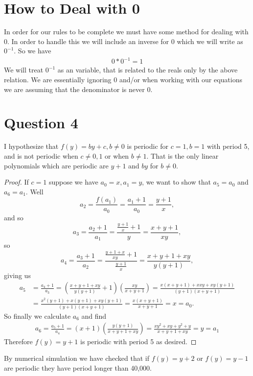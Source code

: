 \documentclass[12pt]{article}
\begin{document}
\maketitle
\section{How to Deal with 0}
In order for our rules to be complete we must have some method for dealing with $0$. In order to handle this we will include an inverse for $0$ which we will write as $0^{-1}$. So we have 
\begin{align*}
0*0^{-1} =1
\end{align*}
We will treat $0^{-1}$ as an variable, that is related to the reals only by the above relation. We are essentially ignoring $0$ and/or when working with our equations we are assuming that the denominator is never $0$.

\section{Question 4} 
I hypothesize that $f(y) = by+c, b \neq 0$ is periodic for $c = 1, b=1$ with period 5, and is not periodic when $c \neq 0,1$ or when $b \neq 1$. That is the only linear polynomials which are periodic are $y+1$ and $by$ for $ b \neq 0$. 
\begin{proof}
If $c=1$ suppose we have $a_0 =x, a_1 =y$, we want to show that $a_5=a_0$ and $a_6=a_1$. Well 
\begin{equation*}
a_2 = \frac{f(a_1)}{a_0} = \frac{ a_1 +1}{a_0} = \frac{y+1}{x},
\end{equation*}
and so 
\begin{equation*}
a_3 = \frac{a_2+1}{a_1} = \frac{ \frac{y+1}{x} +1}{y} = \frac{x+y+1}{xy},
\end{equation*}
so
\begin{equation*}
a_4 = \frac{a_3 +1}{a_2} = \frac{ \frac{y+1+x}{xy} +1}{\frac{y+1}{x}} = \frac{x+y+1+xy}{y(y+1)},
\end{equation*}
giving us 
\begin{align*}
a_5 &=\frac{a_4+1}{a_3} = \left(\frac{x+y+1+xy}{y(y+1)} +1\right)\left( \frac{xy}{x+y+1} \right)= \frac{ x(x+y+1) + xxy + xy(y+1)}{(y+1)(x+y+1)} \\
&= \frac{x^2(y+1) + x(y+1) + xy(y+1)}{(y+1)(x+y+1)} = \frac{x(x+y+1)}{x+y+1} = x = a_0.
\end{align*}
So finally we calculate $a_6$ and find 
\begin{align*}
a_6 = \frac{a_5 +1}{a_4} = (x+1)\left( \frac{y(y+1)}{x+y+1+xy} \right) = \frac{xy^2 + xy+y^2+y}{x+y+1+xy} =y =a_1
\end{align*}
Therefore $f(y)=y+1$ is periodic with period 5 as desired. 
\end{proof}
By numerical simulation we have checked that if $f(y) = y+2$ or $f(y)=y-1$ are periodic they have period longer than 40,000. 
\end{document}
